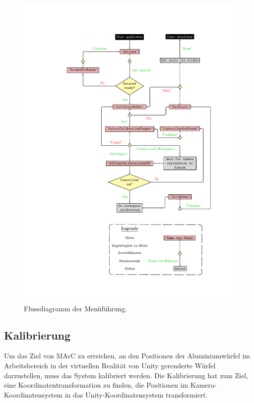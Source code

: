 \begin{figure}[htbp]
	\centering
	\includegraphics[scale=.9, trim=5cm 2.5cm 3.5cm 2.5cm]{kapitel/system/MP_Menu_Flowchart.pdf}
	\caption{Flussdiagramm der Menüführung.}
\end{figure}
\subsection{Kalibrierung}\label{sec:calib}
Um das Ziel von MArC zu erreichen, an den Positionen der Aluminiumwürfel im Arbeitsbereich in der virtuellen Realität von Unity gerenderte Würfel darzustellen, muss das System kalibriert werden. Die Kalibrierung hat zum Ziel, eine Koordinatentransformation zu finden, die Positionen im Kamera-Koordinatensystem in das Unity-Koordinatensystem transformiert.

